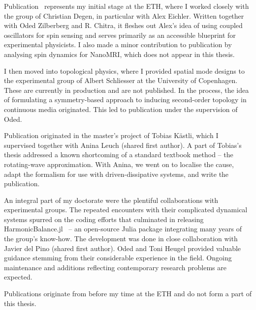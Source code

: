 Publication~\cite{Kosata_2020} represents my initial stage at the ETH, where I worked closely with the group of Christian Degen, in particular with Alex Eichler. Written together with Oded Zilberberg and R. Chitra, it fleshes out Alex's idea of using coupled oscillators for spin sensing and serves primarily as an accessible blueprint for experimental physicists. I also made a minor contribution to publication \cite{Grob_2019} by analysing spin dynamics for NanoMRI, which does not appear in this thesis.

I then moved into topological physics, where I provided spatial mode designs to the experimental group of Albert Schliesser at the University of Copenhagen. These are currently in production and are not published. In the process, the idea of formulating a symmetry-based approach to inducing second-order topology in continuous media originated. This led to publication \cite{Kosata_2021} under the supervision of Oded.

Publication \cite{Kosata_2022b} originated in the master's project of Tobias K\"{a}stli, which I supervised together with Anina Leuch (shared first author). A part of Tobias's thesis addressed a known shortcoming of a standard textbook method -- the rotating-wave approximation. With Anina, we went on to localise the cause, adapt the formalism for use with driven-dissipative systems, and write the publication.

An integral part of my doctorate were the plentiful collaborations with experimental groups. The repeated encounters with their complicated dynamical systems spurred on the coding efforts that culminated in releasing HarmonicBalance.jl~\cite{Kosata_2022a} -- an open-source Julia package integrating many years of the group's know-how. The development was done in close collaboration with Javier del Pino (shared first author). Oded and Toni Heugel provided valuable guidance stemming from their considerable experience in the field. Ongoing maintenance and additions reflecting contemporary research problems are expected.

Publications \cite{Kosata_2018a, Kosata_2018b, Nilsen_2017} originate from before my time at the ETH and do not form a part of this thesis.


